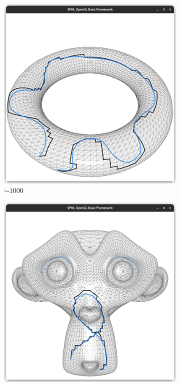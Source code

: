 \documentclass{stdlocal}
\begin{document}
\begin{figure}
  \centering
  \begin{subfigure}[b]{0.24\linewidth}
    \centering
    \includegraphics[width=\linewidth,trim={15px 20 15 50},clip]{images/torus-smooth-0.95.png}
    \caption{$\sim 1000$}
  \end{subfigure}
  \begin{subfigure}[b]{0.24\linewidth}
    \centering
    \includegraphics[width=\linewidth,trim={15px 20 15 50},clip]{images/suzanne-smooth-0.95.png}

\end{subfigure}
\end{figure}
\end{document}
